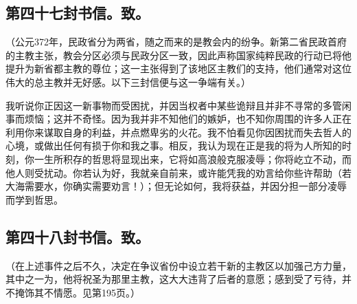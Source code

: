 
\subsection{第四十七封书信。致。}

（公元372年，民政省分为两省，随之而来的是教会内的纷争。新第二省民政首府的主教主张，教会分区必须与民政分区一致，因此声称国家纯粹民政的行动已将他提升为新省都主教的尊位；这一主张得到了该地区主教们的支持，他们通常对这位伟大的总主教并无好感。以下三封信便与这一争端有关。）\par

我听说你正因这一新事物而受困扰，并因当权者中某些诡辩且并非不寻常的多管闲事而烦恼；这并不奇怪。因为我并非不知他们的嫉妒，也不知你周围的许多人正在利用你来谋取自身的利益，并点燃卑劣的火花。我不怕看见你因困扰而失去哲人的心境，或做出任何有损于你和我之事。相反，我认为现在正是我的将为人所知的时刻，你一生所积存的哲思将显现出来，它将如高浪般克服凌辱；你将屹立不动，而他人则受扰动。你若认为好，我就亲自前来，或许能凭我的劝言给你些许帮助（若大海需要水，你确实需要劝言！）；但无论如何，我将获益，并因分担一部分凌辱而学到哲思。\par


\subsection{第四十八封书信。致。}

（在上述事件之后不久，决定在争议省份中设立若干新的主教区以加强己方力量，其中之一为，他将祝圣为那里主教，这大大违背了后者的意愿；感到受了亏待，并不掩饰其不情愿。见第195页。）\par


